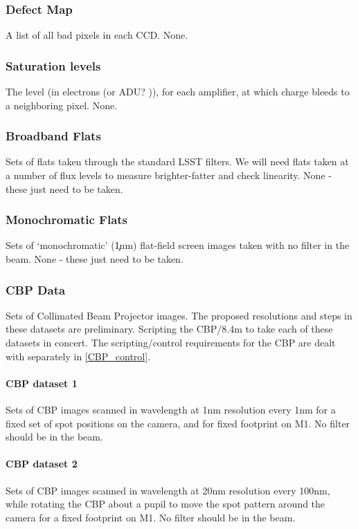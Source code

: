 \subsubsection{Defect Map}\label{sec:calibInputs:defectList} 
\cameraTeam
A list of all bad pixels in each CCD.
\alg None.


\subsubsection{Saturation levels}\label{sec:calibInputs:saturationLevel}
\cameraTeam
The level (in electrons (or ADU? \xxx)), for each amplifier, at which charge bleeds to a neighboring pixel.
\alg None.


\subsubsection{Broadband Flats}\label{sec:calibInputs:broadFlat}
Sets of flats taken through the standard LSST filters. We will need flats taken at a number of flux levels to measure brighter-fatter and check linearity.
\alg None - these just need to be taken.


\subsubsection{Monochromatic Flats}\label{sec:calibInputs:monoFlat}
Sets of `monochromatic' (\c 1nm) flat-field screen images taken with no filter in the beam.
\alg None - these just need to be taken.


\subsubsection{CBP Data}\label{sec:calibInputs:CBP}
Sets of Collimated Beam Projector images. The proposed resolutions and steps in these datasets are preliminary.
\alg Scripting the CBP/8.4m to take each of these datasets in concert. The scripting/control requirements for the CBP are dealt with separately in \secsymbol\ref{CBP_control}.


\paragraph{CBP dataset 1}\label{sec:calibInputs:CBP:mono}
Sets of CBP images scanned in wavelength at 1nm resolution every 1nm for a fixed set of spot positions on the camera, and for fixed footprint on M1. No filter should be in the beam.
	
	
\paragraph{CBP dataset 2}\label{sec:calibInputs:CBP:spot}
Sets of CBP images scanned in wavelength at 20nm resolution every 100nm, while rotating the CBP about a pupil to move the spot pattern around the camera for a fixed footprint on M1. No filter should be in the beam.

